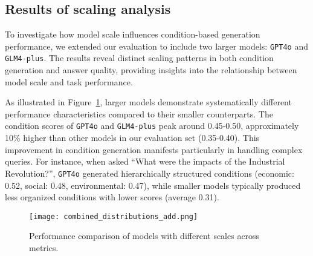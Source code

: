 

\subsection{Results of scaling analysis}

To investigate how model scale influences condition-based generation performance, we extended our evaluation to include two larger models: \texttt{GPT4o} and \texttt{GLM4-plus}. The results reveal distinct scaling patterns in both condition generation and answer quality, providing insights into the relationship between model scale and task performance.

As illustrated in Figure~\ref{fig:expand-distributions}, larger models demonstrate systematically different performance characteristics compared to their smaller counterparts. The condition scores of \texttt{GPT4o} and \texttt{GLM4-plus} peak around 0.45-0.50, approximately 10\% higher than other models in our evaluation set (0.35-0.40). This improvement in condition generation manifests particularly in handling complex queries. For instance, when asked ``What were the impacts of the Industrial Revolution?'', \texttt{GPT4o} generated hierarchically structured conditions (economic: 0.52, social: 0.48, environmental: 0.47), while smaller models typically produced less organized conditions with lower scores (average 0.31).

\begin{figure}[h]
\centering
\texttt{[image: combined\_distributions\_add.png]}
\caption{Performance comparison of models with different scales across metrics.}
\label{fig:expand-distributions}
\end{figure}

